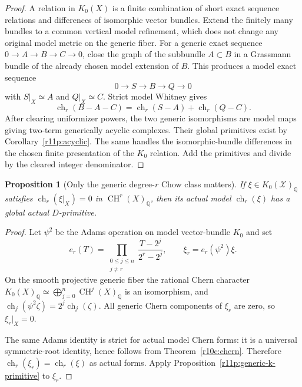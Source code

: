 \documentclass[11pt]{article}
\newtheorem{proposition}[theorem]{Proposition}
\theoremstyle{definition}
\theoremstyle{remark}
\numberwithin{equation}{section}
\begin{document}
\begin{proof}
A relation in $K_0(X)$ is a finite combination of short exact sequence
relations and differences of isomorphic vector bundles.  Extend the
finitely many bundles to a common vertical model refinement, which
does not change any original model metric on the generic fiber.
For a generic exact sequence $0\to A\to B\to C\to0$, close the graph
of the subbundle $A\subset B$ in a Grassmann bundle of the already
chosen model extension of $B$.  This produces a model exact sequence
\[
                         0\to S\to B\to Q\to0
\]
with $S|_X\simeq A$ and $Q|_X\simeq C$.  Strict model Whitney gives
\[
      \operatorname{ch}_r(B-A-C)
       =\operatorname{ch}_r(S-A)+\operatorname{ch}_r(Q-C).
\]
After clearing uniformizer powers, the two generic isomorphisms are
model maps giving two-term generically acyclic complexes.  Their
global primitives exist by Corollary~\ref{r11p:acyclic}.
The same handles the isomorphic-bundle differences in the chosen
finite presentation of the $K_0$ relation.  Add the primitives and
divide by the cleared integer denominator.
\end{proof}

\begin{proposition}[Only the generic degree-$r$ Chow class matters]
\label{r11p:generic-chow-primitive}
If $\xi\in K_0(\mathcal X)_{\mathbb Q}$ satisfies
$\operatorname{ch}_r(\xi|_X)=0$ in
$\operatorname{CH}^r(X)_{\mathbb Q}$, then its actual model
$\operatorname{ch}_r(\xi)$ has a global actual $D$-primitive.
\end{proposition}

\begin{proof}
Let $\psi^2$ be the Adams operation on model vector-bundle $K_0$ and set
\[
 e_r(T)=\prod_{\substack{0\leq j\leq n\\j\ne r}}
                  \frac{T-2^j}{2^r-2^j},
 \qquad
                            \xi_r=e_r(\psi^2)\xi.
\]
On the smooth projective generic fiber the rational Chern character
$K_0(X)_{\mathbb Q}\simeq\bigoplus_{j=0}^n
\operatorname{CH}^j(X)_{\mathbb Q}$ is an isomorphism, and
$\operatorname{ch}_j(\psi^2\zeta)=2^j\operatorname{ch}_j(\zeta)$.
All generic Chern components of $\xi_r$ are zero, so $\xi_r|_X=0$.

The same Adams identity is strict for actual model Chern forms:
it is a universal symmetric-root identity, hence follows from
Theorem~\ref{r10c:chern}.
Therefore $\operatorname{ch}_r(\xi_r)=\operatorname{ch}_r(\xi)$
as actual forms.  Apply Proposition~\ref{r11p:generic-k-primitive}
to $\xi_r$.
\end{proof}
\end{document}
